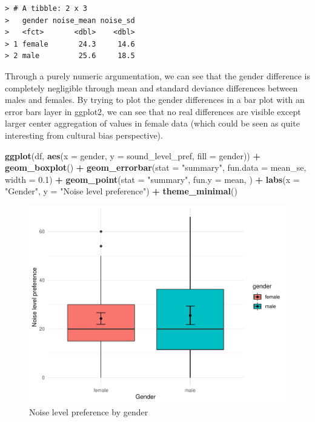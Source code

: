 \documentclass[]{article}
\newenvironment{Shaded}{\begin{snugshade}}{\end{snugshade}}
\newcommand{\DataTypeTok}[1]{\textcolor[rgb]{0.13,0.29,0.53}{#1}}
\newcommand{\FloatTok}[1]{\textcolor[rgb]{0.00,0.00,0.81}{#1}}
\newcommand{\KeywordTok}[1]{\textcolor[rgb]{0.13,0.29,0.53}{\textbf{#1}}}
\newcommand{\NormalTok}[1]{#1}
\newcommand{\OperatorTok}[1]{\textcolor[rgb]{0.81,0.36,0.00}{\textbf{#1}}}
\newcommand{\StringTok}[1]{\textcolor[rgb]{0.31,0.60,0.02}{#1}}
\begin{document}
\begin{verbatim}
> # A tibble: 2 x 3
>   gender noise_mean noise_sd
>   <fct>       <dbl>    <dbl>
> 1 female       24.3     14.6
> 2 male         25.6     18.5
\end{verbatim}

Through a purely numeric argumentation, we can see that the gender difference is completely negligible through mean and standard deviance differences between males and females. By trying to plot the gender differences in a bar plot with an error bars layer in ggplot2, we can see that no real differences are visible except larger center aggregation of values in female data (which could be seen as quite interesting from cultural bias perspective).

\begin{Shaded}
\begin{Highlighting}[]
\KeywordTok{ggplot}\NormalTok{(df, }\KeywordTok{aes}\NormalTok{(}\DataTypeTok{x =}\NormalTok{ gender, }\DataTypeTok{y =}\NormalTok{ sound_level_pref, }\DataTypeTok{fill =}\NormalTok{ gender)) }\OperatorTok{+}\StringTok{ }\KeywordTok{geom_boxplot}\NormalTok{() }\OperatorTok{+}\StringTok{ }
\StringTok{    }\KeywordTok{geom_errorbar}\NormalTok{(}\DataTypeTok{stat =} \StringTok{"summary"}\NormalTok{, }\DataTypeTok{fun.data =}\NormalTok{ mean_se, }\DataTypeTok{width =} \FloatTok{0.1}\NormalTok{) }\OperatorTok{+}\StringTok{ }\KeywordTok{geom_point}\NormalTok{(}\DataTypeTok{stat =} \StringTok{"summary"}\NormalTok{, }
    \DataTypeTok{fun.y =}\NormalTok{ mean, ) }\OperatorTok{+}\StringTok{ }\KeywordTok{labs}\NormalTok{(}\DataTypeTok{x =} \StringTok{"Gender"}\NormalTok{, }\DataTypeTok{y =} \StringTok{"Noise level preference"}\NormalTok{) }\OperatorTok{+}\StringTok{ }\KeywordTok{theme_minimal}\NormalTok{()}
\end{Highlighting}
\end{Shaded}

\begin{figure}
\centering
\includegraphics{Personality-Data-Analysis-Portfolio-1_files/figure-latex/unnamed-chunk-6-1.pdf}
\caption{\label{fig:unnamed-chunk-6}Noise level preference by gender}
\end{figure}
\end{document}
